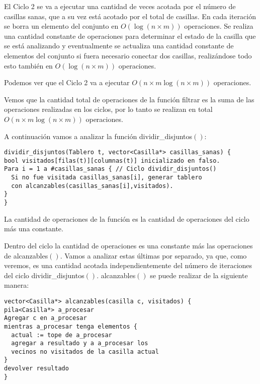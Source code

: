 \documentclass[a4paper, 12pt] {article}
\begin{document}
El Ciclo 2 se va a ejecutar una cantidad de veces acotada por el n\'umero de casillas sanas, que a su vez est\'a acotado por el total de casillas. En cada iteraci\'on se borra un elemento del conjunto en $O\left( \log\left( n\times m \right) \right) $ operaciones. Se realiza una cantidad constante de operaciones para determinar el estado de la casilla que se est\'a analizando y eventualmente se actualiza una cantidad constante de elementos del conjunto si fuera necesario conectar dos casillas, realiz\'andose todo esto tambi\'en en $O\left( \log\left( n\times m\right) \right) $ operaciones. 


Podemos ver que el Ciclo 2 va a ejecutar $O\left( n\times m \log\left( n\times m\right) \right) $ operaciones.

Vemos que la cantidad total de operaciones de la funci\'on filtrar es la suma de las operaciones realizadas en los ciclos, por lo tanto se realizan en total $O\left( n\times m \log\left( n\times m\right) \right) $ operaciones.


A continuaci\'on vamos a analizar la funci\'on dividir\_disjuntos$\left( \right) $:

\begin{verbatim}
dividir_disjuntos(Tablero t, vector<Casilla*> casillas_sanas) {
bool visitados[filas(t)][columnas(t)] inicializado en falso.
Para i = 1 a #casillas_sanas { // Ciclo dividir_disjuntos()
  Si no fue visitada casillas_sanas[i], generar tablero
  con alcanzables(casillas_sanas[i],visitados).
}
}
\end{verbatim}

La cantidad de operaciones de la funci\'on es la cantidad de operaciones del ciclo m\'as una constante. 


Dentro del ciclo la cantidad de operaciones es una constante m\'as las operaciones de alcanzables$\left( \right) $. Vamos a analizar estas \'ultimas por separado, ya que, como veremos, es una cantidad acotada independientemente del n\'umero de iteraciones del ciclo dividir\_disjuntos$\left( \right) $.
alcanzables$\left( \right) $ se puede realizar de la siguiente manera:

\begin{verbatim}
vector<Casilla*> alcanzables(casilla c, visitados) {
pila<Casilla*> a_procesar
Agregar c en a_procesar
mientras a_procesar tenga elementos {
  actual := tope de a_procesar
  agregar a resultado y a a_procesar los 
  vecinos no visitados de la casilla actual
}
devolver resultado
}
\end{verbatim}
\end{document}
